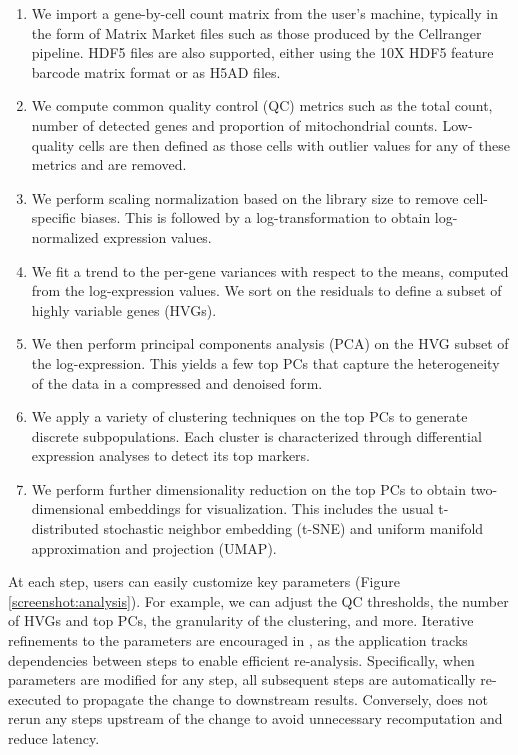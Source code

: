 \documentclass{article}
\begin{document}
\begin{enumerate}
\item We import a gene-by-cell count matrix from the user's machine, typically in the form of Matrix Market files such as those produced by the Cellranger pipeline.
HDF5 files are also supported, either using the 10X HDF5 feature barcode matrix format or as H5AD files.
\item We compute common quality control (QC) metrics such as the total count, number of detected genes and proportion of mitochondrial counts.
Low-quality cells are then defined as those cells with outlier values for any of these metrics and are removed.
\item We perform scaling normalization based on the library size to remove cell-specific biases.
This is followed by a log-transformation to obtain log-normalized expression values.
\item We fit a trend to the per-gene variances with respect to the means, computed from the log-expression values.
We sort on the residuals to define a subset of highly variable genes (HVGs). 
\item We then perform principal components analysis (PCA) on the HVG subset of the log-expression.
This yields a few top PCs that capture the heterogeneity of the data in a compressed and denoised form.
\item We apply a variety of clustering techniques on the top PCs to generate discrete subpopulations.
Each cluster is characterized through differential expression analyses to detect its top markers.
\item We perform further dimensionality reduction on the top PCs to obtain two-dimensional embeddings for visualization. 
This includes the usual t-distributed stochastic neighbor embedding (t-SNE) and uniform manifold approximation and projection (UMAP).
\end{enumerate}

At each step, users can easily customize key parameters (Figure \ref{screenshot:analysis}).
For example, we can adjust the QC thresholds, the number of HVGs and top PCs, the granularity of the clustering, and more. 
Iterative refinements to the parameters are encouraged in , as the application tracks dependencies between steps to enable efficient re-analysis.
Specifically, when parameters are modified for any step, all subsequent steps are automatically re-executed to propagate the change to downstream results.
Conversely,  does not rerun any steps upstream of the change to avoid unnecessary recomputation and reduce latency.
\end{document}
